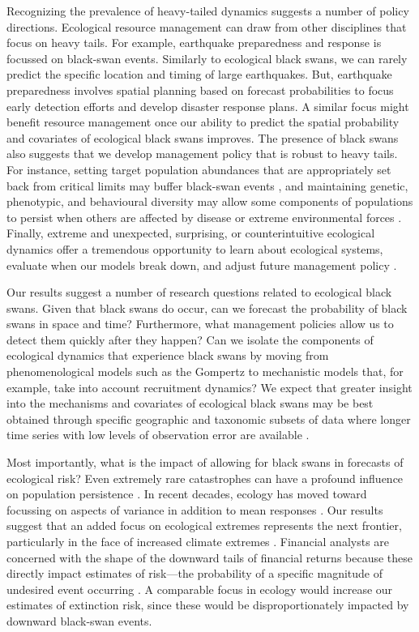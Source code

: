 Recognizing the prevalence of heavy-tailed dynamics suggests a number of
policy directions. Ecological resource management can draw from other
disciplines that focus on heavy tails. For example, earthquake preparedness
and response is focussed on black-swan events. Similarly to ecological black
swans, we can rarely predict the specific location and timing of large
earthquakes. But, earthquake preparedness involves spatial planning based on
forecast probabilities to focus early detection efforts and develop disaster
response plans. A similar focus might benefit resource management once our
ability to predict the spatial probability and covariates of ecological black
swans improves. The presence of black swans also suggests that we develop
management policy that is robust to heavy tails. For instance, setting target
population abundances that are appropriately set back from critical limits may
buffer black-swan events \citep[e.g.][]{caddy1996}, and maintaining genetic,
phenotypic, and behavioural diversity may allow some components of populations
to persist when others are affected by disease or extreme environmental forces
\citep[e.g.][]{hilborn2003, schindler2010, anderson2014}. Finally, extreme and
unexpected, surprising, or counterintuitive ecological dynamics offer a
tremendous opportunity to learn about ecological systems, evaluate when our
models break down, and adjust future management policy \citep{doak2008,
  pine-iii2009, lindenmayer2010}.

Our results suggest a number of research questions related to ecological black
swans. Given that black swans do occur, can we forecast the probability of
black swans in space and time? Furthermore, what management policies allow us
to detect them quickly after they happen? Can we isolate the components of
ecological dynamics that experience black swans by moving from
phenomenological models such as the Gompertz to mechanistic models that, for
example, take into account recruitment dynamics? We expect that greater
insight into the mechanisms and covariates of ecological black swans may be
best obtained through specific geographic and taxonomic subsets of data where
longer time series with low levels of observation error are available
\citep[e.g.][]{segura2013}.

Most importantly, what is the impact of allowing for black swans in forecasts
of ecological risk? Even extremely rare catastrophes can have a profound
influence on population persistence \citep{mangel1994}. In recent decades,
ecology has moved toward focussing on aspects of variance in addition to mean
responses \citep[e.g.][]{loreau2010a, thompson2013}. Our results suggest that
an added focus on ecological extremes represents the next frontier,
particularly in the face of increased climate extremes \citep{meehl2004,
  ipcc2012, thompson2013}. Financial analysts are concerned with the shape of
the downward tails of financial returns because these directly impact
estimates of risk---the probability of a specific magnitude of undesired event
occurring \citep{rachev2008}. A comparable focus in ecology would increase our
estimates of extinction risk, since these would be disproportionately impacted
by downward black-swan events.


